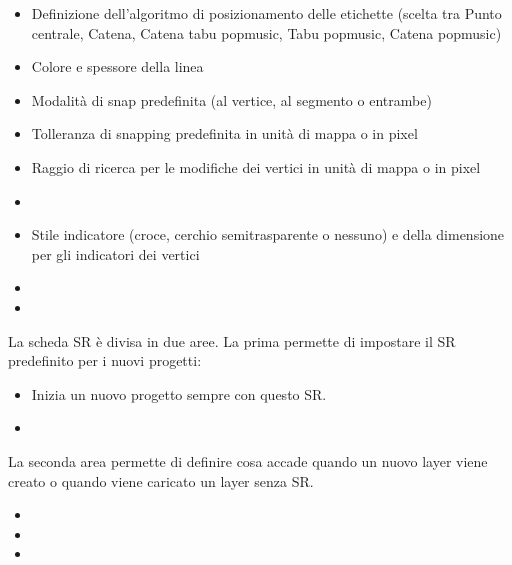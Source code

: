 
\begin{itemize}
\item Definizione dell'algoritmo di posizionamento delle etichette (scelta tra Punto centrale, Catena, Catena tabu popmusic, Tabu popmusic, Catena popmusic)
\end{itemize}


\begin{itemize}
\item Colore e spessore della linea
\item Modalità di snap predefinita (al vertice, al segmento o entrambe)
\item Tolleranza di snapping predefinita in unità di mappa o in pixel
\item Raggio di ricerca per le modifiche dei vertici in unità di mappa o in pixel
\item {}
\item Stile indicatore (croce, cerchio semitrasparente o nessuno) e della dimensione per gli indicatori dei vertici 
\item {}
\item {}
\end{itemize}


La scheda SR è divisa in due aree. La prima permette di impostare il SR predefinito per i nuovi progetti: 

\begin{itemize}
\item Inizia un nuovo progetto sempre con questo SR.
\item {}
\end{itemize}

La seconda area permette di definire cosa accade quando un nuovo layer viene creato o quando viene caricato un layer senza SR.
\begin{itemize}
\item {}
\item {}
\item {}
\end{itemize}

